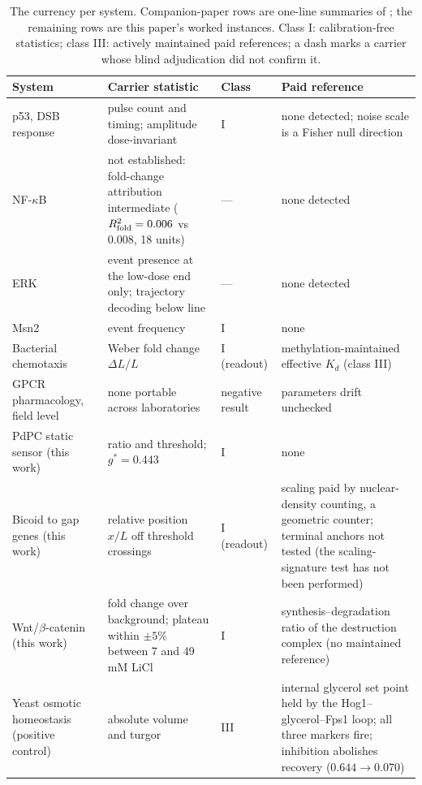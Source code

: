 \documentclass[11pt,a4paper]{article}
\begin{document}
\begin{table}[t]
\centering
\caption{The currency per system. Companion-paper rows are one-line summaries of \cite{CompanionP53,CompanionChemo,CompanionGPCR}; the remaining rows are this paper's worked instances. Class I: calibration-free statistics; class III: actively maintained paid references; a dash marks a carrier whose blind adjudication did not confirm it.}
\label{tab:census}
\small
\begin{tabular}{@{}p{3.2cm}p{4.4cm}p{1.5cm}p{5.2cm}@{}}
\toprule
\textbf{System} & \textbf{Carrier statistic} & \textbf{Class} & \textbf{Paid reference} \\
\midrule
p53, DSB response \cite{CompanionP53} & pulse count and timing; amplitude dose-invariant & I & none detected; noise scale is a Fisher null direction \\
NF-$\kappa$B \cite{Hoffmann2002,Tay2010} & not established: fold-change attribution intermediate ($R^2_{\rm fold}=0.006$ vs $0.008$, 18 units) & --- & none detected \\
ERK \cite{Albeck2013,Chavez2022} & event presence at the low-dose end only; trajectory decoding below line & --- & none detected \\
Msn2 \cite{Cai2008,Hao2012,Hansen2021} & event frequency & I & none \\
Bacterial chemotaxis \cite{CompanionChemo} & Weber fold change $\Delta L/L$ & I (readout) & methylation-maintained effective $K_d$ (class III) \\
GPCR pharmacology, field level \cite{CompanionGPCR} & none portable across laboratories & negative result & parameters drift unchecked \\
PdPC static sensor (this work) & ratio and threshold; $g^*=0.443$ & I & none \\
Bicoid to gap genes (this work) & relative position $x/L$ off threshold crossings & I (readout) & scaling paid by nuclear-density counting, a geometric counter; terminal anchors not tested (the scaling-signature test has not been performed) \\
Wnt/$\beta$-catenin (this work) & fold change over background; plateau within $\pm5\%$ between 7 and 49 mM LiCl & I & synthesis--degradation ratio of the destruction complex (no maintained reference) \\
Yeast osmotic homeostasis (positive control) & absolute volume and turgor & III & internal glycerol set point held by the Hog1--glycerol--Fps1 loop; all three markers fire; inhibition abolishes recovery ($0.644\to0.070$) \\
\bottomrule
\end{tabular}
\end{table}
\end{document}
